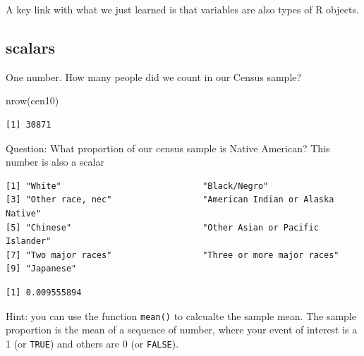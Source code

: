 \documentclass[
  letterpaper,
]{book}
\newenvironment{Shaded}{\begin{snugshade}}{\end{snugshade}}
\newcommand{\CommentTok}[1]{\textcolor[rgb]{0.37,0.37,0.37}{#1}}
\newcommand{\FunctionTok}[1]{\textcolor[rgb]{0.28,0.35,0.67}{#1}}
\newcommand{\NormalTok}[1]{\textcolor[rgb]{0.00,0.23,0.31}{#1}}
\newcommand{\SpecialCharTok}[1]{\textcolor[rgb]{0.37,0.37,0.37}{#1}}
\newcommand{\StringTok}[1]{\textcolor[rgb]{0.13,0.47,0.30}{#1}}
\theoremstyle{definition}
\theoremstyle{definition}
\theoremstyle{plain}
\theoremstyle{definition}
\theoremstyle{plain}
\theoremstyle{plain}
\theoremstyle{remark}
\begin{document}
A key link with what we just learned is that variables are also types of
R objects.

\hypertarget{scalars}{%
\subsection{scalars}\label{scalars}}

One number. How many people did we count in our Census sample?

\begin{Shaded}
\begin{Highlighting}[]
\FunctionTok{nrow}\NormalTok{(cen10)}
\end{Highlighting}
\end{Shaded}

\begin{verbatim}
[1] 30871
\end{verbatim}

Question: What proportion of our census sample is Native American? This
number is also a scalar

\begin{Shaded}
\end{Shaded}

\begin{verbatim}
[1] "White"                            "Black/Negro"                     
[3] "Other race, nec"                  "American Indian or Alaska Native"
[5] "Chinese"                          "Other Asian or Pacific Islander" 
[7] "Two major races"                  "Three or more major races"       
[9] "Japanese"                        
\end{verbatim}

\begin{Shaded}
\end{Shaded}

\begin{verbatim}
[1] 0.009555894
\end{verbatim}

Hint: you can use the function \texttt{mean()} to calcualte the sample
mean. The sample proportion is the mean of a sequence of number, where
your event of interest is a 1 (or \texttt{TRUE}) and others are 0 (or
\texttt{FALSE}).
\end{document}
